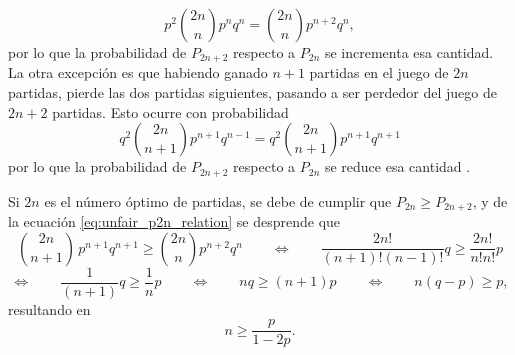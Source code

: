 \documentclass[a4paper]{report}
\begin{document}
\[
 p^2\binom{2n}{n}p^nq^n=\binom{2n}{n}p^{n+2}q^n,
\]
por lo que la probabilidad de \(P_{2n+2}\) respecto a \(P_{2n}\) se incrementa esa cantidad. La otra excepción es que habiendo ganado \(n+1\) partidas en el juego de \(2n\) partidas, pierde las dos partidas siguientes, pasando a ser perdedor del juego de \(2n+2\) partidas. Esto ocurre con probabilidad
\[
 q^2\binom{2n}{n+1}p^{n+1}q^{n-1}=q^2\binom{2n}{n+1}p^{n+1}q^{n+1}
\]
por lo que la probabilidad de \(P_{2n+2}\) respecto a \(P_{2n}\) se reduce esa cantidad \cite{mosteller2006optimal}. 

Si \(2n\) es el número óptimo de partidas, se debe de cumplir que \(P_{2n}\geq P_{2n+2}\), y de la ecuación \ref{eq:unfair_p2n_relation} se desprende que
\[
 \binom{2n}{n+1}\,p^{n+1}q^{n+1}\geq \binom{2n}{n}p^{n+2}q^{n} \qquad\Leftrightarrow\qquad
 \frac{2n!}{(n+1)!(n-1)!}q\geq \frac{2n!}{n!n!}p
\]
\[
 \Leftrightarrow\qquad \frac{1}{(n+1)}q\geq \frac{1}{n}p \qquad\Leftrightarrow\qquad
 nq\geq(n+1)p \qquad\Leftrightarrow\qquad n(q-p)\geq p,
\]
resultando en
\begin{equation}\label{eq:unfair_n_opt_inf}
 n\geq \frac{p}{1-2p}.
\end{equation}
\end{document}
